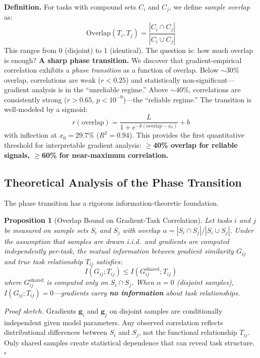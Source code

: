 \documentclass[sigconf,nonacm]{acmart}
\newtheorem{proposition}{Proposition}
\begin{document}
\textbf{Definition.} For tasks with compound sets $C_i$ and $C_j$, we define \textit{sample overlap} as:
\begin{equation}
    \text{Overlap}(T_i, T_j) = \frac{|C_i \cap C_j|}{|C_i \cup C_j|}
\end{equation}%
This ranges from 0 (disjoint) to 1 (identical). The question is: how much overlap is enough?
\textbf{A sharp phase transition.} We discover that gradient-empirical correlation exhibits a \textit{phase transition} as a function of overlap. Below $\sim$30\% overlap, correlations are weak ($r < 0.25$) and statistically non-significant---gradient analysis is in the ``unreliable regime.'' Above $\sim$40\%, correlations are consistently strong ($r > 0.65$, $p < 10^{-9}$)---the ``reliable regime.'' The transition is well-modeled by a sigmoid:
\begin{equation}
    r(\text{overlap}) = \frac{L}{1 + e^{-k(\text{overlap} - x_0)}} + b
\end{equation}%
with inflection at $x_0 = 29.7\%$ ($R^2 = 0.94$). This provides the first quantitative threshold for interpretable gradient analysis: \textbf{$\geq$40\% overlap for reliable signals, $\geq$60\% for near-maximum correlation.}

\subsection{Theoretical Analysis of the Phase Transition}

The phase transition has a rigorous information-theoretic foundation.

\begin{proposition}[Overlap Bound on Gradient-Task Correlation]
Let tasks $i$ and $j$ be measured on sample sets $S_i$ and $S_j$ with overlap $\alpha = |S_i \cap S_j| / |S_i \cup S_j|$. Under the assumption that samples are drawn i.i.d.\ and gradients are computed independently per-task, the mutual information between gradient similarity $G_{ij}$ and true task relationship $T_{ij}$ satisfies:
\begin{equation}
    I(G_{ij}; T_{ij}) \leq I(G_{ij}^{\text{shared}}; T_{ij})
\end{equation}
where $G_{ij}^{\text{shared}}$ is computed only on $S_i \cap S_j$. When $\alpha = 0$ (disjoint samples), $I(G_{ij}; T_{ij}) = 0$---gradients carry \textbf{no information} about task relationships.
\end{proposition}

\textit{Proof sketch.} Gradients $\mathbf{g}_i$ and $\mathbf{g}_j$ on disjoint samples are conditionally independent given model parameters. Any observed correlation reflects distributional differences between $S_i$ and $S_j$, not the functional relationship $T_{ij}$. Only shared samples create statistical dependence that can reveal task structure. $\square$
\end{document}
